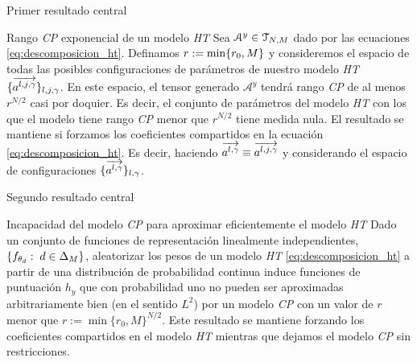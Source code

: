 \begin{frame}{Primer resultado central}

	\begin{block}{Rango \textit{CP} exponencial de un modelo \textit{HT}}
		Sea $\mathcal{A}^y \in \mathcal{T}_{N, M}$ dado por las ecuaciones \eqref{eq:descomposicion_ht}. Definamos $r := \min \{ r_0, M \}$ y consideremos el espacio de todas las posibles configuraciones de parámetros de nuestro modelo \textit{HT} $\{  \overrightarrow{a^{l, j, \gamma}} \}_{l, j, \gamma}$. En este espacio, el tensor generado $\mathcal{A}^y$ tendrá rango \textit{CP} de al menos $r^{N/2}$ casi por doquier. Es decir, el conjunto de parámetros del modelo \textit{HT} con los que el modelo tiene rango \textit{CP} menor que $r^{N/2}$ tiene medida nula. El resultado se mantiene si forzamos los coeficientes compartidos en la ecuación \eqref{eq:descomposicion_ht}. Es decir, haciendo $\overrightarrow{a^{l, \gamma}} \equiv \overrightarrow{a^{l, j, \gamma}}$ y considerando el espacio de configuraciones $\{ \overrightarrow{a^{l, \gamma}}  \}_{l, \gamma}$.

	\end{block}


\end{frame}

\begin{frame}{Segundo resultado central}

	\begin{block}{Incapacidad del modelo \textit{CP} para aproximar eficientemente el modelo \textit{HT}}
		Dado un conjunto de funciones de representación linealmente independientes, $\{ f_{\theta_d}: \; d \in \Delta_{M} \}$, aleatorizar los pesos de un modelo \textit{HT} \eqref{eq:descomposicion_ht} a partir de una distribución de probabilidad continua induce funciones de puntuación $h_y$ que con probabilidad uno no pueden ser aproximadas arbitrariamente bien (en el sentido $L^2$) por un modelo \textit{CP} con un valor de $r$ menor que $r := \min \{r_0, M \}^{N/2}$. Este resultado se mantiene forzando los coeficientes compartidos en el modelo \textit{HT} mientras que dejamos el modelo \textit{CP} sin restricciones.
	\end{block}

\end{frame}

